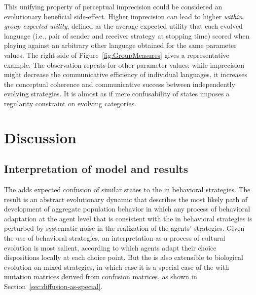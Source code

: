 \documentclass[fleqn,reqno,10pt]{article}
\newcommand{\rd}{\acro{rd}} %
\newcommand{\rmd}{\acro{rmd}} %
\newcommand{\rdd}{\acro{rdd}} %
\begin{document}
This unifying property of perceptual imprecision could be considered
an evolutionary beneficial side-effect. Higher imprecision can lead to
higher \emph{within group expected utility}, defined as the average
expected utility that each evolved language (i.e., pair of sender and
receiver strategy at stopping time) scored when playing against an
arbitrary other language obtained for the same parameter values. The
right side of Figure~\ref{fig:GroupMeasures} gives a representative
example. The observation repeats for other parameter values: while
imprecision might decrease the communicative efficiency of individual
languages, it increases the conceptual coherence and communicative
success between independently evolving strategies. It is almost as if
mere confusability of states imposes a regularity constraint on
evolving categories.


\section{Discussion}
\label{sec:discussion}

\subsection{Interpretation of model and results}
\label{sec:model-interpretation}

The \rdd adds expected confusion of similar states to the \rd in
behavioral strategies. The result is an abstract evolutionary dynamic
that describes the most likely path of development of aggregate
population behavior in which any process of behavioral adaptation at
the agent level that is consistent with the \rd in behavioral
strategies is perturbed by systematic noise in the realization of the
agents' strategies. Given the use of behavioral strategies, an
interpretation as a process of cultural evolution is most salient,
according to which agents adapt their choice dispositions locally at
each choice point. But the \rdd is also extensible to biological
evolution on mixed strategies, in which case it is a special case of
the \rmd with mutation matrices derived from confusion matrices, as
shown in Section~\ref{sec:diffusion-as-special}. 
\end{document}
